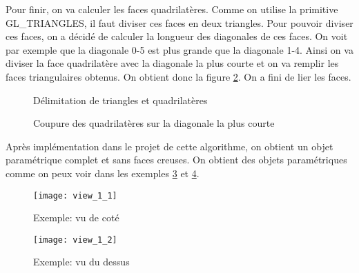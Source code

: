 \documentclass[article, backcover, french, nodocumentinfo]{upmethodology-document}
\begin{document}
		Pour finir, on va calculer les faces quadrilatères. Comme on utilise la primitive GL\_TRIANGLES, il faut diviser ces faces en deux triangles. Pour pouvoir diviser ces faces, on a décidé de calculer la longueur des diagonales de ces faces. On voit par exemple que la diagonale 0-5 est plus grande que la diagonale 1-4. Ainsi on va diviser la face quadrilatère avec la diagonale la plus courte et on va remplir les faces triangulaires obtenus. On obtient donc la figure \ref{fig:layers_4_quadrilaterals_diagonals}. On a fini de lier les faces.
		\par\noindent\begin{minipage}[t]{\textwidth}
			\centering
			\begin{minipage}[t]{0.49\textwidth}
				\begin{figure}[H]
					\centering%
					\caption{Délimitation de triangles et quadrilatères}
					\label{fig:layers_3_triangles_quadrilaterals}%
				\end{figure}
			\end{minipage}
			\begin{minipage}[t]{0.49\textwidth}
				\begin{figure}[H]
					\centering%
					\caption{Coupure des quadrilatères sur la diagonale la plus courte}%
					\label{fig:layers_4_quadrilaterals_diagonals}%
				\end{figure}
			\end{minipage}
		\end{minipage}
		
		Après implémentation dans le projet de cette algorithme, on obtient un objet paramétrique complet et sans faces creuses. On obtient des objets paramétriques comme on peux voir dans les exemples \ref{fig:view_1_1} et \ref{fig:view_1_2}.
		\par\noindent\begin{minipage}[t]{\textwidth}
			\centering
			\begin{minipage}[t]{0.49\textwidth}
				\begin{figure}[H]
					\centering%
					\texttt{[image: view\_1\_1]}%
					\caption{Exemple: vu de coté}%
					\label{fig:view_1_1}%
				\end{figure}
			\end{minipage}
			\begin{minipage}[t]{0.49\textwidth}
				\begin{figure}[H]
					\centering%
					\texttt{[image: view\_1\_2]}%
					\caption{Exemple: vu du dessus}%
					\label{fig:view_1_2}%
				\end{figure}
			\end{minipage}
		\end{minipage}
\end{document}
